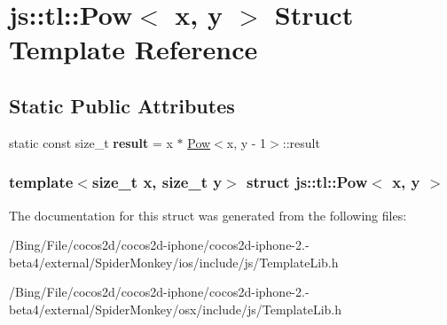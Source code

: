 \hypertarget{structjs_1_1tl_1_1_pow}{\section{js\-:\-:tl\-:\-:Pow$<$ x, y $>$ Struct Template Reference}
\label{structjs_1_1tl_1_1_pow}
}
\subsection*{Static Public Attributes}
\begin{DoxyCompactItemize}
\item 
\hypertarget{structjs_1_1tl_1_1_pow_a35372d4bf96d09789cf6fabf4145fa4b}{static const size\-\_\-t {\bfseries result} = x $\ast$ \hyperlink{structjs_1_1tl_1_1_pow}{Pow}$<$x, y -\/ 1$>$\-::result}\label{structjs_1_1tl_1_1_pow_a35372d4bf96d09789cf6fabf4145fa4b}

\end{DoxyCompactItemize}
\subsubsection*{template$<$size\-\_\-t x, size\-\_\-t y$>$ struct js\-::tl\-::\-Pow$<$ x, y $>$}



The documentation for this struct was generated from the following files\-:\begin{DoxyCompactItemize}
\item 
/\-Bing/\-File/cocos2d/cocos2d-\/iphone/cocos2d-\/iphone-\/2.-\/beta4/external/\-Spider\-Monkey/ios/include/js/Template\-Lib.\-h\item 
/\-Bing/\-File/cocos2d/cocos2d-\/iphone/cocos2d-\/iphone-\/2.-\/beta4/external/\-Spider\-Monkey/osx/include/js/Template\-Lib.\-h\end{DoxyCompactItemize}
